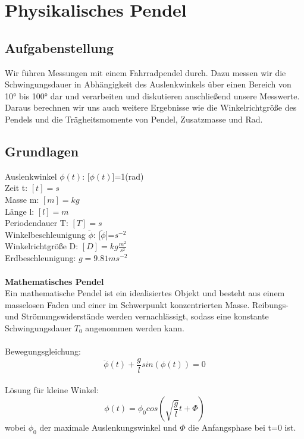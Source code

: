 \documentclass{article}
\begin{document}
\section{Physikalisches Pendel}
\subsection{Aufgabenstellung}
Wir führen Messungen mit einem Fahrradpendel durch. Dazu messen wir die Schwingungsdauer in Abhängigkeit des Auslenkwinkels über einen Bereich von 10° bis 100° dar und verarbeiten und diskutieren anschließend unsere Messwerte. 
Daraus berechnen wir uns auch weitere Ergebnisse wie die Winkelrichtgröße des Pendels und die Trägheitsmomente von Pendel, Zusatzmasse und Rad. 

\subsection{Grundlagen}
Auslenkwinkel $\phi(t)$: [$\phi(t)$]=1(rad)\\
Zeit t: $[t]=s$\\
Masse m: $[m]=kg$\\
Länge l: $[l]=m$\\
Periodendauer T: $[T]=s$\\
Winkelbeschleunigung $\ddot{\phi}$: [$\ddot{\phi}$]=$s^{-2}$\\
Winkelrichtgröße D: $[D]=kg \frac{m^2}{s^2}$\\
Erdbeschleunigung: $g=9.81ms^{-2}$\\
\\
\textbf{Mathematisches Pendel}\\
Ein mathematische Pendel ist ein idealisiertes Objekt und besteht aus einem masselosen Faden und einer im Schwerpunkt konzentrierten Masse. Reibungs- und Strömungswiderstände werden vernachlässigt, sodass eine konstante Schwingungsdauer $T_0$ angenommen werden kann.\\
\\
Bewegungsgleichung:
\begin{equation*}
\ddot{\phi}(t)+\frac{g}{l}sin(\phi(t))=0
\end{equation*}\\
Lösung für kleine Winkel:
\begin{equation*}
\phi(t)=\phi_0cos(\sqrt{\frac{g}{l}}t+\Phi)
\end{equation*}
wobei $\phi_0$ der maximale Auslenkungswinkel und $\Phi$ die Anfangsphase bei t=0 ist. \\
\\
\end{document}
